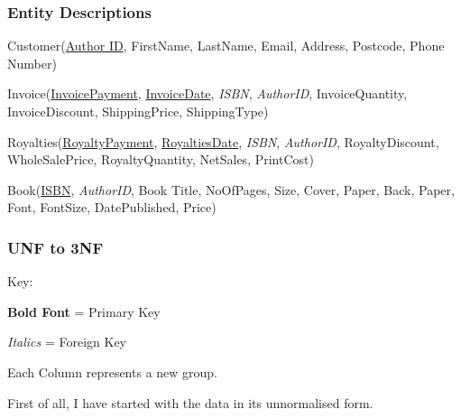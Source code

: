 \subsubsection{Entity Descriptions}

Customer(\underline{Author ID}, FirstName, LastName, Email, Address, Postcode, Phone Number)

Invoice(\underline{InvoicePayment}, \underline{InvoiceDate}, \emph{ISBN}, \emph{AuthorID}, InvoiceQuantity, InvoiceDiscount, ShippingPrice, ShippingType)

Royalties(\underline{RoyaltyPayment}, \underline{RoyaltiesDate}, \emph{ISBN}, \emph{AuthorID}, RoyaltyDiscount, WholeSalePrice, RoyaltyQuantity, NetSales, PrintCost)

Book(\underline{ISBN}, \emph{AuthorID}, Book Title, NoOfPages, Size, Cover, Paper, Back, Paper, Font, FontSize, DatePublished, Price)

\subsubsection{UNF to 3NF}

Key:

\textbf{Bold Font} = Primary Key

\emph{Italics} = Foreign Key

Each Column represents a new group.

\newpage
First of all, I have started with the data in its unnormalised form.

